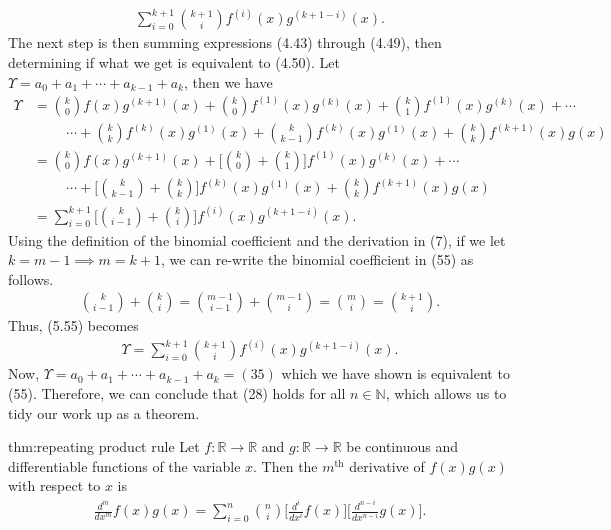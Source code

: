 \begin{align}
	\sum_{i=0}^{k+1}{{k+1}\choose{i}}f^{(i)}(x) g^{(k+1-i)}(x) .
\end{align}
The next step is then summing expressions (4.43) through (4.49), then determining if what we get is equivalent to (4.50). Let $\Upsilon=a_0+a_1+\cdots+a_{k-1}+a_k$, then we have
\begin{align}
	\Upsilon&={{k}\choose{0}}f(x)g^{(k+1)}(x)+{{k}\choose{0}}f^{(1)}(x)g^{(k)}(x)+{{k}\choose{1}}f^{(1)}(x)g^{(k)}(x)+\cdots\\
	&\hspace{1cm}\cdots+{{k}\choose{k}}f^{(k)}(x)g^{(1)}(x)+{{k}\choose{k-1}}f^{(k)}(x)g^{(1)}(x)+{{k}\choose{k}}f^{(k+1)}(x)g(x) \\
	&={{k}\choose{0}}f(x)g^{(k+1)}(x)+\bigg[{{k}\choose{0}}+{{k}\choose{1}} \bigg]f^{(1)}(x)g^{(k)}(x)+\cdots\\
	&\hspace{1cm}\cdots+\bigg[{{k}\choose{k-1}}+{{k}\choose{k}} \bigg]f^{(k)}(x)g^{(1)}(x)+{{k}\choose{k}}f^{(k+1)}(x)g(x)\\
	&=\sum_{i=0}^{k+1}\bigg[{{k}\choose{i-1}}+{{k}\choose{i}} \bigg]f^{(i)}(x)g^{(k+1-i)}(x).
\end{align}
Using the definition of the binomial coefficient and the derivation in (7), if we let $k=m-1 \implies m=k+1$, we can re-write the binomial coefficient in (55) as follows.
\begin{align}
	{{k}\choose{i-1}}+{{k}\choose{i}}={{m-1}\choose{i-1}}+{{m-1}\choose{i}}={{m}\choose{i}}={{k+1}\choose{i}}.
\end{align}
Thus, (5.55) becomes
\begin{align}
	\Upsilon=\sum_{i=0}^{k+1}{{k+1}\choose{i}}f^{(i)}(x)g^{(k+1-i)}(x).
\end{align}
Now, $\Upsilon=a_0+a_1+\cdots+a_{k-1}+a_k=(35)$ which we have shown is equivalent to (55). Therefore, we can conclude that (28) holds for all $n\in\mathbb{N}$, which allows us to tidy our work up as a theorem.
\begin{theo}{thm:repeating product rule}
	Let $f:\mathbb{R}\rightarrow\mathbb{R}$ and $g:\mathbb{R}\rightarrow\mathbb{R}$ be continuous and differentiable functions of the variable $x$. Then the $m^{\textrm{th}}$ derivative of $f(x)g(x)$ with respect to $x$ is
	\begin{align*}
		\frac{d^m}{dx^m}f(x)g(x)=\sum_{i=0}^{n}{{n}\choose{i}}\bigg[\frac{d^i}{dx^i}f(x) \bigg]\bigg[\frac{d^{n-i}}{dx^{n-i}}g(x) \bigg].
	\end{align*}
\end{theo}



